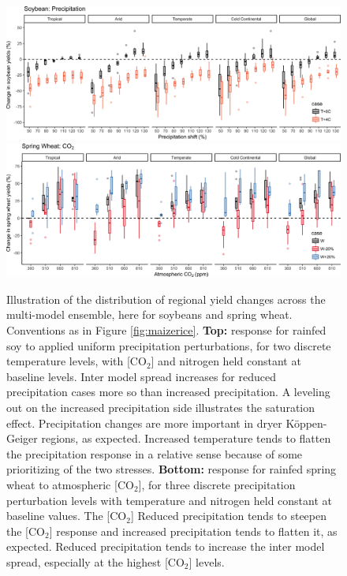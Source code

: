 \documentclass[gmd, manuscript]{copernicus} %
\begin{document}
\begin{figure}[ht]
\centering
  \includegraphics[width=15cm]{figures/soy_sim_CG_W.png}
  \includegraphics[width=15cm]{figures/swh_sim_CG_C.png}
  \caption{Illustration of the distribution of regional yield changes across the multi-model ensemble, here for soybeans and spring wheat. Conventions as in Figure \ref{fig:maizerice}.
  \textbf{Top:} response for rainfed soy to applied uniform precipitation perturbations, for two discrete temperature levels, with [CO$_2$] and nitrogen held constant at baseline levels. Inter model spread increases for reduced precipitation cases more so than increased precipitation. A leveling out on the increased precipitation side illustrates the saturation effect. Precipitation changes are more important in dryer K\"{o}ppen-Geiger regions, as expected.   Increased temperature tends to flatten the precipitation response in a relative sense because of some prioritizing of the two stresses. 
  \textbf{Bottom:} response for rainfed spring wheat to atmospheric [CO$_2$], for three discrete precipitation perturbation levels with temperature and nitrogen held constant at baseline values.
  The [CO$_2$] 
  Reduced precipitation tends to steepen the [CO$_2$] response and increased precipitation tends to flatten it, as expected. Reduced precipitation tends to increase the inter model spread, especially at the highest [CO$_2$] levels.
   }
   \label{fig:soywheat}
\end{figure}
\end{document}

